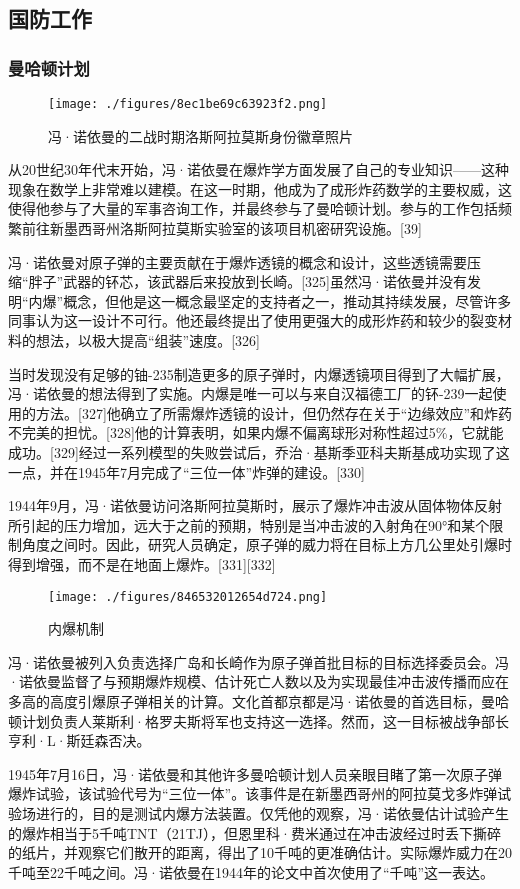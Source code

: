 \subsection{国防工作}
\subsubsection{曼哈顿计划} 
\begin{figure}[ht]
\centering
\texttt{[image: ./figures/8ec1be69c63923f2.png]}
\caption{冯·诺依曼的二战时期洛斯阿拉莫斯身份徽章照片} \label{fig_Neuman_11}
\end{figure} 
从20世纪30年代末开始，冯·诺依曼在爆炸学方面发展了自己的专业知识——这种现象在数学上非常难以建模。在这一时期，他成为了成形炸药数学的主要权威，这使得他参与了大量的军事咨询工作，并最终参与了曼哈顿计划。参与的工作包括频繁前往新墨西哥州洛斯阿拉莫斯实验室的该项目机密研究设施。[39]

冯·诺依曼对原子弹的主要贡献在于爆炸透镜的概念和设计，这些透镜需要压缩“胖子”武器的钚芯，该武器后来投放到长崎。[325]虽然冯·诺依曼并没有发明“内爆”概念，但他是这一概念最坚定的支持者之一，推动其持续发展，尽管许多同事认为这一设计不可行。他还最终提出了使用更强大的成形炸药和较少的裂变材料的想法，以极大提高“组装”速度。[326]

当时发现没有足够的铀-235制造更多的原子弹时，内爆透镜项目得到了大幅扩展，冯·诺依曼的想法得到了实施。内爆是唯一可以与来自汉福德工厂的钚-239一起使用的方法。[327]他确立了所需爆炸透镜的设计，但仍然存在关于“边缘效应”和炸药不完美的担忧。[328]他的计算表明，如果内爆不偏离球形对称性超过5\%，它就能成功。[329]经过一系列模型的失败尝试后，乔治·基斯季亚科夫斯基成功实现了这一点，并在1945年7月完成了“三位一体”炸弹的建设。[330]

1944年9月，冯·诺依曼访问洛斯阿拉莫斯时，展示了爆炸冲击波从固体物体反射所引起的压力增加，远大于之前的预期，特别是当冲击波的入射角在90°和某个限制角度之间时。因此，研究人员确定，原子弹的威力将在目标上方几公里处引爆时得到增强，而不是在地面上爆炸。[331][332]
\begin{figure}[ht]
\centering
\texttt{[image: ./figures/846532012654d724.png]}
\caption{内爆机制} \label{fig_Neuman_12}
\end{figure}
冯·诺依曼被列入负责选择广岛和长崎作为原子弹首批目标的目标选择委员会。冯·诺依曼监督了与预期爆炸规模、估计死亡人数以及为实现最佳冲击波传播而应在多高的高度引爆原子弹相关的计算。文化首都京都是冯·诺依曼的首选目标，曼哈顿计划负责人莱斯利·格罗夫斯将军也支持这一选择。然而，这一目标被战争部长亨利·L·斯廷森否决。

1945年7月16日，冯·诺依曼和其他许多曼哈顿计划人员亲眼目睹了第一次原子弹爆炸试验，该试验代号为“三位一体”。该事件是在新墨西哥州的阿拉莫戈多炸弹试验场进行的，目的是测试内爆方法装置。仅凭他的观察，冯·诺依曼估计试验产生的爆炸相当于5千吨TNT（21TJ），但恩里科·费米通过在冲击波经过时丢下撕碎的纸片，并观察它们散开的距离，得出了10千吨的更准确估计。实际爆炸威力在20千吨至22千吨之间。冯·诺依曼在1944年的论文中首次使用了“千吨”这一表达。

